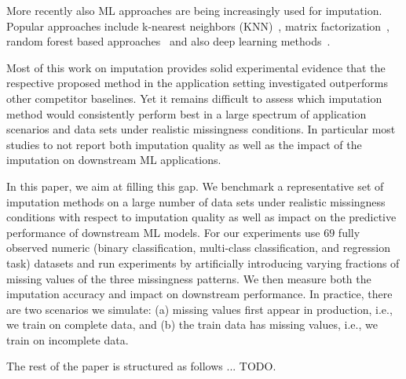 More recently also ML approaches are being increasingly used for imputation. Popular approaches include k-nearest neighbors (KNN)~\citep{Batista2003}, matrix factorization~\citep{Troyanskaya2001,Koren2009,Mazumder2010}, random forest based approaches~\citep{Stekhoven2012} and also deep learning methods~\citep{HIVAE,GAIN,Biessmann2018a}.

%

Most of this work on imputation provides solid experimental evidence that the respective proposed method in the application setting investigated outperforms other competitor baselines. Yet it remains difficult to assess which imputation method would consistently perform best in a large spectrum of application scenarios and data sets under realistic missingness conditions. In particular most studies to not report both imputation quality as well as the impact of the imputation on downstream ML applications. 

In this paper, we aim at filling this gap. We benchmark a representative set of imputation methods on a large number of data sets under realistic missingness conditions with respect to imputation quality as well as impact on the predictive performance of downstream ML models. For our experiments use $69$ fully observed numeric (binary classification, multi-class classification, and regression task) datasets and run experiments by artificially introducing varying fractions of missing values of the three missingness patterns. We then measure both the imputation accuracy and impact on downstream performance. In practice, there are two scenarios we simulate: (a) missing values first appear in production, i.e., we train on complete data, and (b) the train data has missing values, i.e., we train on incomplete data.

The rest of the paper is structured as follows ... TODO.
